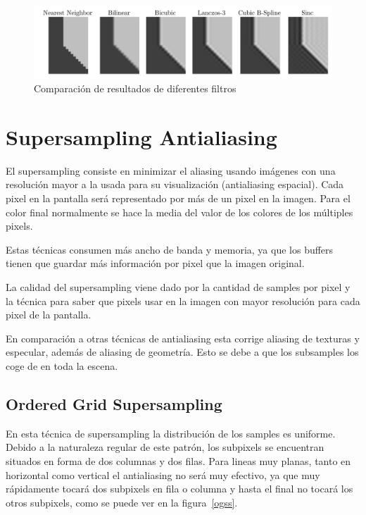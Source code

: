 \documentclass[withindex, glossary]{cam-thesis}
\begin{document}
\begin{figure}[!htb]
    \includegraphics[width=\linewidth]{figures/comparison-filter.png}
    \caption{Comparación de resultados de diferentes filtros\cite{resampling2}}
\end{figure}

\section{Supersampling Antialiasing}

El supersampling consiste en minimizar el aliasing usando imágenes con una resolución mayor a la usada para su visualización (antialiasing espacial). Cada pixel en la pantalla será representado por más de un pixel en la imagen. Para el color final normalmente se hace la media del valor de los colores de los múltiples pixels.

Estas técnicas consumen más ancho de banda y memoria, ya que los buffers tienen que guardar más información por pixel que la imagen original.

La calidad del supersampling viene dado por la cantidad de samples por pixel y la técnica para saber que pixels usar en la imagen con mayor resolución para cada pixel de la pantalla.

En comparación a otras técnicas de antialiasing esta corrige aliasing de texturas y especular, además de aliasing de geometría. Esto se debe a que los subsamples los coge de en toda la escena.

\subsection{Ordered Grid Supersampling}

En esta técnica de supersampling la distribución de los samples es uniforme. Debido a la naturaleza regular de este patrón, los subpixels se encuentran situados en forma de dos columnas y dos filas. Para lineas muy planas, tanto en horizontal como vertical el antialiasing no será muy efectivo, ya que muy rápidamente tocará dos subpixels en fila o columna y hasta el final no tocará los otros subpixels, como se puede ver en la figura~\ref{ogss}.
\end{document}
